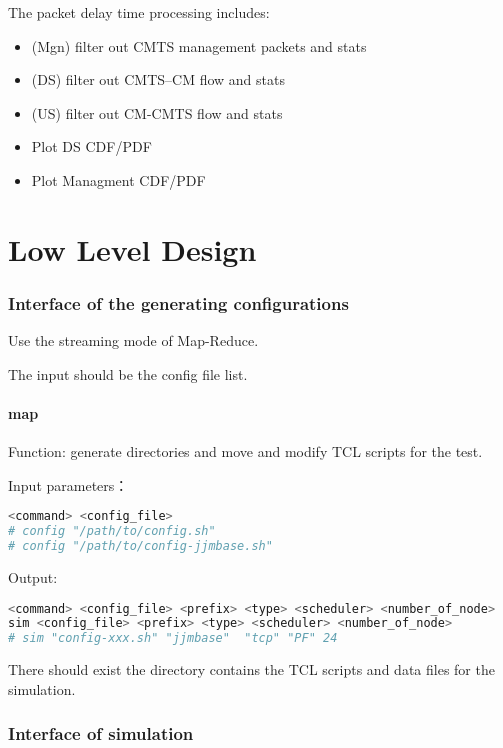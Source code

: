 The packet delay time processing includes:
\begin{itemize}
  \item (Mgn) filter out CMTS management packets and stats
  \item (DS) filter out CMTS--CM flow and stats
  \item (US) filter out CM-CMTS flow and stats
  \item Plot DS CDF/PDF
  \item Plot Managment CDF/PDF
\end{itemize}


\chapter{Low Level Design}


\subsection{Interface of the generating configurations}

Use the streaming mode of Map-Reduce.

The input should be the config file list.


\subsubsection{map}
Function: generate directories and move and modify TCL scripts for the test.


Input parameters：
\begin{lstlisting}[language=bash]
<command> <config_file>
# config "/path/to/config.sh"
# config "/path/to/config-jjmbase.sh"
\end{lstlisting}


Output:
\begin{lstlisting}[language=bash]
<command> <config_file> <prefix> <type> <scheduler> <number_of_node>
sim <config_file> <prefix> <type> <scheduler> <number_of_node>
# sim "config-xxx.sh" "jjmbase"  "tcp" "PF" 24
\end{lstlisting}

There should exist the directory contains the TCL scripts and data files for the simulation.





\subsection{Interface of simulation}

